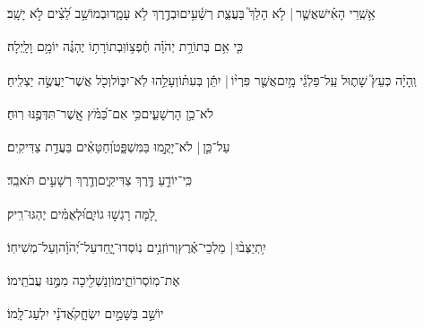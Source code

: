 \documentclass[12pt]{article}
\newcommand{\loc}[1]{\textsuperscript{\locf{#1}}}
\begin{document}
                        \pend\ledpb
\pstart[\subsection*{\textcolor{red}{פרק א}}]\label{פרק א}
{\loc{ א}~}‏אַ֥שְֽׁרֵי הָאִ֗ישׁ{\hfill}אֲשֶׁ֤ר |  לֹ֥א הָלַךְ֮ בַּעֲצַ֢ת רְשָׁ֫עִ֥ים\newline\hspace*{.5em}וּבְדֶ֣רֶךְ  לֹ֥א עָמָ֑ד{\hfill}וּבְמוֹשַׁ֥ב לֵ֝צִ֗ים לֹ֣א יָשָֽׁב׃\par

{\loc{ ב}~}‏כִּ֤י אִ֥ם בְּתוֹרַ֥ת יְהֹוָ֗ה חֶ֫פְצ֥וֹ{\hfill}וּֽבְתוֹרָת֥וֹ יֶהְגֶּ֗ה יוֹמָ֥ם וָלָֽיְלָה׃\par

{\loc{ ג}~}‏וְֽהָיָ֗ה כְּעֵץ֮ שָׁת֢וּל עַֽל־פַּלְגֵ֫י מָ֥יִם{\hfill}אֲשֶׁ֤ר פִּרְי֨וֹ |  יִתֵּ֬ן בְּעִתּ֗וֹ\newline\hspace*{.5em}וְעָלֵ֥הוּ לֹֽא־יִבּ֑וֹל{\hfill}וְכֹ֖ל אֲשֶׁר־יַעֲשֶׂ֣ה יַצְלִֽיחַ׃\par

{\loc{ ד}~}‏לֹא־כֵ֥ן הָרְשָׁעִ֑ים{\hfill}כִּ֥י אִם־כַּ֝מֹּ֗ץ אֲֽשֶׁר־תִּדְּפֶ֥נּוּ רֽוּחַ׃\par

{\loc{ ה}~}‏עַל־כֵּ֤ן |  לֹא־יָקֻ֣מוּ  בַּמִּשְׁפָּ֑ט{\hfill}וְ֝חַטָּאִ֗ים בַּעֲדַ֥ת צַדִּיקִֽים׃\par

{\loc{ ו}~}‏כִּֽי־יוֹדֵ֣עַ  דֶּ֣רֶךְ צַדִּיקִ֑ים{\hfill}וְדֶ֖רֶךְ רְשָׁעִ֣ים תֹּאבֵֽד׃\par\pend

\pstart[\subsection*{\textcolor{red}{פרק ב}}]\label{פרק ב}
{\loc{ א}~}‏לָ֭מָּה רָגְשׁ֣וּ גוֹיִ֑ם{\hfill}וּ֝לְאֻמִּ֗ים יֶהְגּוּ־רִֽיק׃\par

{\loc{ ב}~}‏יִ֥תְיַצְּב֨וּ |  מַלְכֵי־אֶ֗רֶץ{\hfill}וְרוֹזְנִ֥ים נֽוֹסְדוּ־יָ֑חַד\newline\hspace*{.5em}עַל־יְ֝הֹוָ֗ה{\hfill}וְעַל־מְשִׁיחֽוֹ׃\par

{\loc{ ג}~}‏ אֶת־מֽוֹסְרוֹתֵ֑ימוֹ{\hfill}וְנַשְׁלִ֖יכָה מִמֶּ֣נּוּ עֲבֹתֵֽימוֹ׃\par

{\loc{ ד}~}‏יוֹשֵׁ֣ב בַּשָּׁמַ֣יִם יִשְׂחָ֑ק{\hfill}אֲ֝דֹנָ֗י יִלְעַג־לָֽמוֹ׃\par
\end{document}
